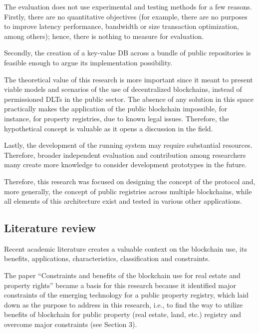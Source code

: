 \begin{multicols}{2}
The evaluation does not use experimental and testing methods for a few reasons. Firstly, there are no quantitative objectives (for example, there are no purposes to improve latency performance, bandwidth or size transaction optimization, among others); hence, there is nothing to measure for evaluation.

Secondly, the creation of a key-value DB across a bundle of public repositories is feasible enough to argue its implementation possibility.

The theoretical value of this research is more important since it meant to present viable models and scenarios of the use of decentralized blockchains, instead of permissioned DLTs in the public sector. The absence of any solution in this space practically makes the application of the public blockchain impossible, for instance, for property registries, due to known legal issues. Therefore, the hypothetical concept is valuable as it opens a discussion in the field.

Lastly, the development of the running system may require substantial resources. Therefore, broader independent evaluation and contribution among researchers many create more knowledge to consider development prototypes in the future.

Therefore, this research was focused on designing the concept of the protocol and, more generally, the concept of public registries across multiple blockchains, while all elements of this architecture exist and tested in various other applications.

\subsection{Literature review}\label{subsec-02.2}

Recent academic literature creates a valuable context on the blockchain use, its benefits, applications, characteristics, classification and constraints.

The paper “Constraints and benefits of the blockchain use for real estate and property rights” \cite{art1-key04} became a basis for this research because it identified major constraints of the emerging technology for a public property registry, which laid down as the purpose to address in this research, i.e., to find the way to utilize benefits of blockchain for public property (real estate, land, etc.) registry and overcome major constraints (see Section 3).


\end{multicols}
